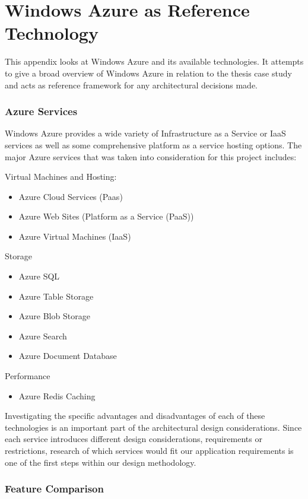 \chapter{Windows Azure as Reference Technology}

This appendix looks at Windows Azure and its available technologies. It attempts to give a broad overview of Windows Azure in relation to the thesis case study and acts as reference framework for any architectural decisions made.

\subsection{Azure Services}

Windows Azure provides a wide variety of Infrastructure as a Service or IaaS services as well as some comprehensive platform as a service hosting options. The major Azure services that was taken into consideration for this project includes:

Virtual Machines and Hosting:
\begin{itemize}
\item Azure Cloud Services (Paas)
\item Azure Web Sites (Platform as a Service (PaaS))
\item Azure Virtual Machines (IaaS)
\end{itemize}

Storage
\begin{itemize}
\item Azure SQL
\item Azure Table Storage
\item Azure Blob Storage
\item Azure Search
\item Azure Document Database
\end{itemize}

Performance
\begin{itemize}
\item Azure Redis Caching
\end{itemize}

Investigating the specific advantages and disadvantages of each of these technologies is an important part of the architectural design considerations. Since each service introduces different design considerations, requirements or restrictions, research of which services would fit our application requirements is one of the first steps within our design methodology.

\subsection{Feature Comparison}

